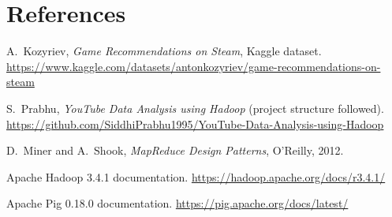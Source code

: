 \documentclass[11pt,a4paper]{article}
\begin{document}
\section*{References}
\begin{enumerate}[label={[\arabic*]}]
  \item A.\ Kozyriev, \emph{Game Recommendations on Steam}, Kaggle dataset.
        \url{https://www.kaggle.com/datasets/antonkozyriev/game-recommendations-on-steam}
  \item S.\ Prabhu, \emph{YouTube Data Analysis using Hadoop} (project structure followed).
        \url{https://github.com/SiddhiPrabhu1995/YouTube-Data-Analysis-using-Hadoop}
  \item D.\ Miner and A.\ Shook, \emph{MapReduce Design Patterns}, O'Reilly, 2012.
  \item Apache Hadoop 3.4.1 documentation. \url{https://hadoop.apache.org/docs/r3.4.1/}
  \item Apache Pig 0.18.0 documentation. \url{https://pig.apache.org/docs/latest/}
\end{enumerate}
\end{document}

